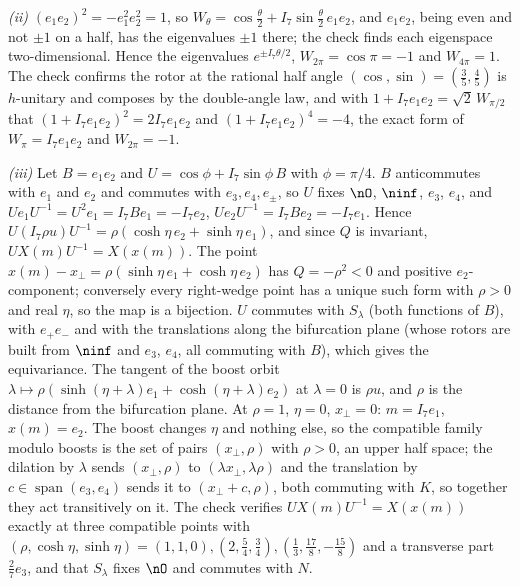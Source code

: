 \emph{(ii)} $(e_{1}e_{2})^{2} = -e_{1}^{2}e_{2}^{2} = 1$, so $W_{\theta} = \cos\tfrac{\theta}{2} + I_{7}\sin\tfrac{\theta}{2}\,e_{1}e_{2}$, and $e_{1}e_{2}$, being even and not $\pm 1$ on a half, has the eigenvalues $\pm 1$ there; the check finds each eigenspace two-dimensional. Hence the eigenvalues $e^{\pm I_{7}\theta/2}$, $W_{2\pi} = \cos\pi = -1$ and $W_{4\pi} = 1$. The check confirms the rotor at the rational half angle $(\cos, \sin) = (\tfrac35, \tfrac45)$ is $h$-unitary and composes by the double-angle law, and with $1 + I_{7}e_{1}e_{2} = \sqrt{2}\,W_{\pi/2}$ that $(1 + I_{7}e_{1}e_{2})^{2} = 2I_{7}e_{1}e_{2}$ and $(1 + I_{7}e_{1}e_{2})^{4} = -4$, the exact form of $W_{\pi} = I_{7}e_{1}e_{2}$ and $W_{2\pi} = -1$.

\emph{(iii)} Let $B = e_{1}e_{2}$ and $U = \cos\phi + I_{7}\sin\phi\,B$ with $\phi = \pi/4$. $B$ anticommutes with $e_{1}$ and $e_{2}$ and commutes with $e_{3}, e_{4}, e_{\pm}$, so $U$ fixes $\nO$, $\ninf$, $e_{3}$, $e_{4}$, and $Ue_{1}U^{-1} = U^{2}e_{1} = I_{7}Be_{1} = -I_{7}e_{2}$, $Ue_{2}U^{-1} = I_{7}Be_{2} = -I_{7}e_{1}$. Hence $U(I_{7}\rho u)U^{-1} = \rho(\cosh\eta\,e_{2} + \sinh\eta\,e_{1})$, and since $Q$ is invariant, $UX(m)U^{-1} = X(x(m))$. The point $x(m) - x_{\perp} = \rho(\sinh\eta\,e_{1} + \cosh\eta\,e_{2})$ has $Q = -\rho^{2} < 0$ and positive $e_{2}$-component; conversely every right-wedge point has a unique such form with $\rho > 0$ and real $\eta$, so the map is a bijection. $U$ commutes with $S_{\lambda}$ (both functions of $B$), with $e_{+}e_{-}$ and with the translations along the bifurcation plane (whose rotors are built from $\ninf$ and $e_{3}$, $e_{4}$, all commuting with $B$), which gives the equivariance. The tangent of the boost orbit $\lambda \mapsto \rho(\sinh(\eta + \lambda)e_{1} + \cosh(\eta + \lambda)e_{2})$ at $\lambda = 0$ is $\rho u$, and $\rho$ is the distance from the bifurcation plane. At $\rho = 1$, $\eta = 0$, $x_{\perp} = 0$: $m = I_{7}e_{1}$, $x(m) = e_{2}$. The boost changes $\eta$ and nothing else, so the compatible family modulo boosts is the set of pairs $(x_{\perp}, \rho)$ with $\rho > 0$, an upper half space; the dilation by $\lambda$ sends $(x_{\perp}, \rho)$ to $(\lambda x_{\perp}, \lambda\rho)$ and the translation by $c \in \operatorname{span}(e_{3}, e_{4})$ sends it to $(x_{\perp} + c, \rho)$, both commuting with $K$, so together they act transitively on it. The check verifies $UX(m)U^{-1} = X(x(m))$ exactly at three compatible points with $(\rho, \cosh\eta, \sinh\eta) = (1, 1, 0), (2, \tfrac54, \tfrac34), (\tfrac13, \tfrac{17}{8}, -\tfrac{15}{8})$ and a transverse part $\tfrac27 e_{3}$, and that $S_{\lambda}$ fixes $\nO$ and commutes with $N$.

